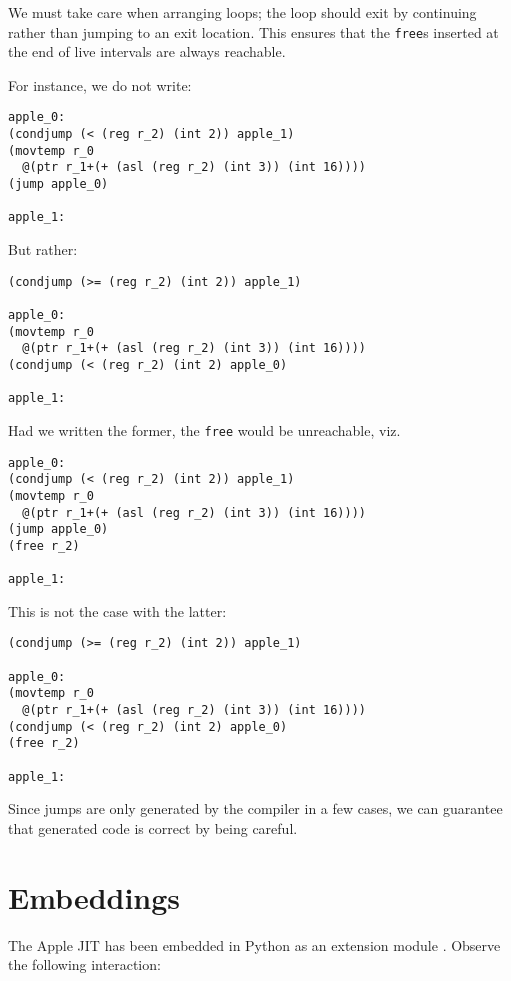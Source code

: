 \documentclass[sigplan,screen,anonymous]{acmart}
\begin{document}
We must take care when arranging loops; the loop should exit by continuing rather than jumping to an exit location. This ensures that the {\tt free}s inserted at the end of live intervals are always reachable.

For instance, we do not write:

\begin{verbatim}
apple_0:
(condjump (< (reg r_2) (int 2)) apple_1)
(movtemp r_0
  @(ptr r_1+(+ (asl (reg r_2) (int 3)) (int 16))))
(jump apple_0)

apple_1:
\end{verbatim}

But rather:

\begin{verbatim}
(condjump (>= (reg r_2) (int 2)) apple_1)

apple_0:
(movtemp r_0
  @(ptr r_1+(+ (asl (reg r_2) (int 3)) (int 16))))
(condjump (< (reg r_2) (int 2) apple_0)

apple_1:
\end{verbatim}

Had we written the former, the {\tt free} would be unreachable, viz.

\begin{verbatim}
apple_0:
(condjump (< (reg r_2) (int 2)) apple_1)
(movtemp r_0
  @(ptr r_1+(+ (asl (reg r_2) (int 3)) (int 16))))
(jump apple_0)
(free r_2)

apple_1:
\end{verbatim}

This is not the case with the latter:

\begin{verbatim}
(condjump (>= (reg r_2) (int 2)) apple_1)

apple_0:
(movtemp r_0
  @(ptr r_1+(+ (asl (reg r_2) (int 3)) (int 16))))
(condjump (< (reg r_2) (int 2) apple_0)
(free r_2)

apple_1:
\end{verbatim}

Since jumps are only generated by the compiler in a few cases, we can guarantee that generated code is correct by being careful.

\section{Embeddings}

The Apple JIT has been embedded in Python as an extension module \cite{pythonext}. Observe the following interaction:
\end{document}
